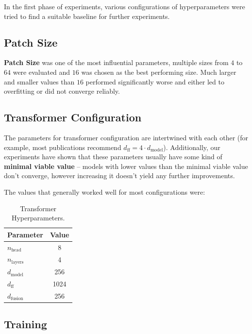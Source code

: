 In the first phase of experiments, various configurations of hyperparameters were tried to find a suitable baseline for further experiments.

\subsection{Patch Size}

\textbf{Patch Size} was one of the most influential parameters, multiple sizes from $4$ to $64$ were evaluated and $16$ was chosen as the best performing size.
Much larger and smaller values than $16$ performed significantly worse and either led to overfitting or did not converge reliably.

\subsection{Transformer Configuration}

The parameters for transformer configuration are intertwined with each other (for example, most publications recommend $d_{\mathrm{ff}} = 4 \cdot d_{\mathrm{model}}$).
Additionally, our experiments have shown that these parameters usually have some kind of \textbf{minimal viable value} -- models with lower values than the minimal viable value don't converge, however increasing it doesn't yield any further improvements.

The values that generally worked well for most configurations were:

\begin{table}[H]
    \centering
    \small
    \renewcommand{\arraystretch}{1.1}
    \begin{tabularx}{\textwidth}{X c}
        \toprule
        \textbf{Parameter} & \textbf{Value} \tabularnewline
        \midrule
        $n_{\mathrm{head}}$ & 8 \tabularnewline
        $n_{\mathrm{layers}}$ & 4 \tabularnewline
        $d_{\mathrm{model}}$ & 256 \tabularnewline
        $d_{\mathrm{ff}}$ & 1024 \tabularnewline
        $d_{\mathrm{fusion}}$ & 256 \tabularnewline
        \bottomrule
    \end{tabularx}
    \caption[Transformer Hyperparameters]{Transformer Hyperparameters.}
    \label{tab:06_transformer_hyperparameters}
\end{table}

\subsection{Training}

